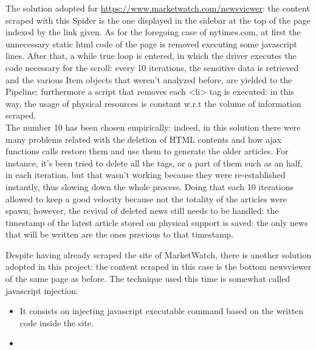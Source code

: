 \par 
The solution adopted for \url{https://www.marketwatch.com/newsviewer}: the content scraped with this Spider is the one displayed in the sidebar at the top of the page indexed by the link given. As for the foregoing case of nytimes.com, at first the unnecessary static html code of the page is removed executing some javascript lines. After that, a while true loop is entered, in which the driver executes the code necessary for the scroll: every 10 iterations, the sensitive data is retrieved and the various Item objects that weren't analyzed before, are yielded to the Pipeline; furthermore a script that removes each <li> tag is executed: in this way, the usage of physical resources is constant w.r.t the volume of information scraped. \\
The number 10 has been chosen empirically: indeed, in this solution there were many problems related with the deletion of HTML contents and how ajax functions calls restore them and use them to generate the older articles. For instance, it's been tried to delete all the tags, or a part of them such as an half, in each iteration, but that wasn't working because they were re-established instantly, thus slowing down the whole process. Doing that each 10 iterations allowed to keep a good velocity because not the totality of the articles were spawn; however, the revival of deleted news still needs to be handled: the timestamp of the latest article stored on physical support is saved: the only news that will be written are the ones previous to that timestamp.
\par 
Despite having already scraped the site of MarketWatch, there is another solution adopted in this project: the content scraped in this case is the bottom newsviewer of the same page as before. The technique used this time is somewhat called javascript injection:
\begin{itemize}
	\item It consists on injecting javascript executable command based on the written code inside the site.
	\item 
\end{itemize}
\par  
